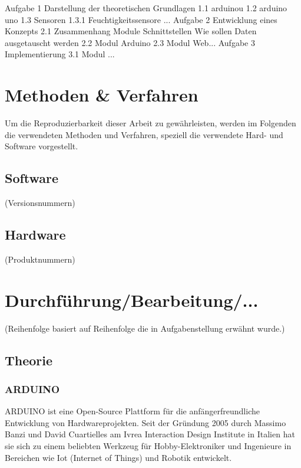 \documentclass[
    load-dhbw-templates,
    load-preamble = true,
    auto-intro-pages = all,
    add-tocs-to-toc,
    debug = true,
    language = english,
    mainlanguage = ngerman,
    add-bibliography,
    bib-file = dhbw-source.bib,
    biblatex/style = alphabetic, 
]{iodhbwm}
\begin{document}
    Aufgabe 1 
    Darstellung der theoretischen Grundlagen
    1.1 arduinou
    1.2 arduino uno
    1.3 Sensoren
    1.3.1 Feuchtigkeitssensore
    ...
    Aufgabe 2
    Entwicklung eines Konzepts
    2.1 Zusammenhang Module
    Schnittstellen
    Wie sollen Daten ausgetauscht werden
    2.2 Modul Arduino
    2.3 Modul Web...
    Aufgabe 3
    Implementierung
    3.1 Modul ... 
    





\chapter{Methoden \& Verfahren}
    Um die Reproduzierbarkeit dieser Arbeit zu gewährleisten, werden im Folgenden die verwendeten Methoden und Verfahren, speziell die verwendete Hard- und Software vorgestellt.
    
    \section{Software}
        (Versionsnummern)
    \section{Hardware}
        (Produktnummern)
    


\chapter{Durchführung/Bearbeitung/...}

(Reihenfolge basiert auf Reihenfolge die in Aufgabenstellung erwähnt wurde.)

    \section{Theorie}
        \subsection{ARDUINO}
        ARDUINO ist eine Open-Source Plattform für die anfängerfreundliche Entwicklung von Hardwareprojekten.
        Seit der Gründung 2005 durch Massimo Banzi und David Cuartielles am Ivrea Interaction Design Institute in Italien hat sie sich zu einem beliebten Werkzeug für Hobby-Elektroniker und Ingenieure in Bereichen wie Iot (Internet of Things) und Robotik entwickelt.  %
       
\end{document}
